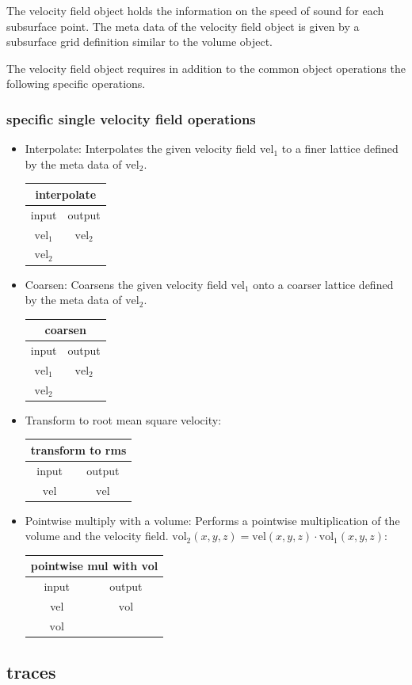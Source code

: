 \documentclass[12pt,a4paper]{article}
\newcommand{\bet}[1]{\begin{center}
		     \begin{tabular}{|c|c|}
		     \hline
		     \multicolumn{2}{|c|}{#1}\\
		     \hline\hline
		     input & output \\
                     \hline}
\newcommand{\eet}{\hline
		  \end{tabular}
		  \end{center}}
\begin{document}
The velocity field object holds the information
on the speed of sound for each subsurface point.
The meta data of the velocity field object is 
given by a subsurface grid definition similar to the 
volume object.

The velocity field object requires in addition to the 
common object operations the following specific operations. 

\subsubsection{specific single velocity field operations}

\begin{itemize}

\item Interpolate:
\newline
Interpolates the given velocity field $\mathrm{vel}_1$ to a 
finer lattice defined by the meta data of $\mathrm{vel}_2$.
\bet{interpolate}
$\mathrm{vel}_1$ & $\mathrm{vel}_2$\\
$\mathrm{vel}_2$ & \\
\eet
\item Coarsen:
\newline
Coarsens the given velocity field $\mathrm{vel}_1$ onto a coarser lattice
defined by the meta data of $\mathrm{vel}_2$.
\bet{coarsen}
$\mathrm{vel}_1$ & $\mathrm{vel}_2$\\
$\mathrm{vel}_2$ & \\
\eet
\item Transform to root mean square velocity:
\bet{transform to rms}
$\mathrm{vel}$ & $\mathrm{vel}$\\
\eet
\item Pointwise multiply with a volume:
\newline
Performs a pointwise multiplication of the volume and the velocity field.  
$\mathrm{vol}_2(x,y,z)=\mathrm{vel}(x,y,z)\cdot \mathrm{vol}_1(x,y,z)$:
\bet{pointwise mul with vol}
vel              & $\mathrm{vol}$ \\
$\mathrm{vol}$ &                  \\
\eet
\end{itemize}


\subsection{traces}
\end{document}
